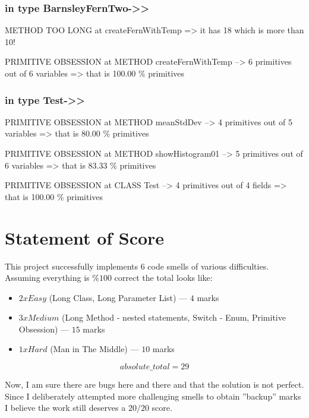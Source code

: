 \documentclass[a4paper]{article}
\begin{document}
\begin{flushleft}
	\subsubsection{in type
		BarnsleyFernTwo-\textgreater{}\textgreater{}}\label{in-type-barnsleyferntwo-}

	METHOD TOO LONG at createFernWithTemp =\textgreater{} it has 18 which is
	more than 10!

	PRIMITIVE OBSESSION at METHOD createFernWithTemp --\textgreater{} 6
	primitives out of 6 variables =\textgreater{} that is 100.00 \%
	primitives

	\subsubsection{in type Test-\textgreater{}\textgreater{}}\label{in-type-test-}

	PRIMITIVE OBSESSION at METHOD meanStdDev --\textgreater{} 4 primitives
	out of 5 variables =\textgreater{} that is 80.00 \% primitives

	PRIMITIVE OBSESSION at METHOD showHistogram01 --\textgreater{} 5
	primitives out of 6 variables =\textgreater{} that is 83.33 \%
	primitives

	PRIMITIVE OBSESSION at CLASS Test --\textgreater{} 4 primitives out of 4
	fields =\textgreater{} that is 100.00 \% primitives

\end{flushleft}

\section{Statement of Score}
This project successfully implements 6 code smells
of various difficulties.
Assuming everything is $\%100$ correct the total looks like:

\begin{itemize}
	\item $2 x Easy$ (Long Class, Long Parameter List) --- $4$ marks
	\item $3 x Medium$ (Long Method - nested statements,
	      Switch - Enum, Primitive Obsession) --- $15$ marks
	\item $1 x Hard$ (Man in The Middle) --- $10$ marks
\end{itemize}
$$absolute\_total = 29$$

Now, I am sure there are bugs here and there and that the
solution is not perfect.
Since I deliberately attempted more challenging 
smells to obtain ''backup'' marks I believe the work
still deserves a $20/20$ score.
\end{document}
